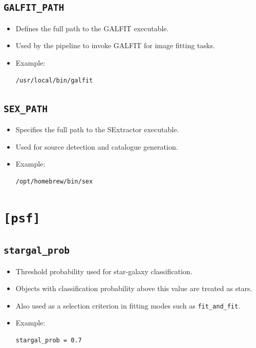 \documentclass[11pt]{article}
\begin{document}
\subsection{\texttt{GALFIT\_PATH}}
\begin{itemize}
\item Defines the full path to the GALFIT executable.
\item Used by the pipeline to invoke GALFIT for image fitting tasks.
\item Example:
\begin{verbatim}
/usr/local/bin/galfit
\end{verbatim}
\end{itemize}

\subsection{\texttt{SEX\_PATH}}
\begin{itemize}
\item Specifies the full path to the SExtractor executable.
\item Used for source detection and catalogue generation.
\item Example:
\begin{verbatim}
/opt/homebrew/bin/sex
\end{verbatim}
\end{itemize}

\section{\texttt{[psf]}}

\subsection{\texttt{stargal\_prob}}
\begin{itemize}
\item Threshold probability used for star-galaxy classification.
\item Objects with classification probability above this value are treated as stars.
\item Also used as a selection criterion in fitting modes such as \texttt{fit\_and\_fit}.
\item Example:
\begin{verbatim}
stargal_prob = 0.7
\end{verbatim}
\end{itemize}
\end{document}
